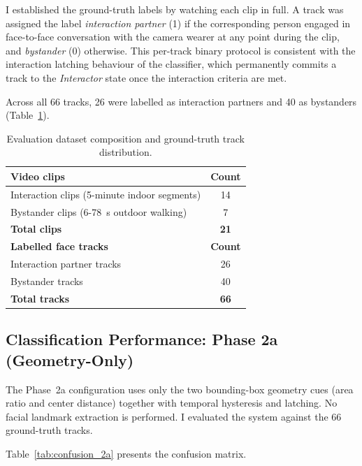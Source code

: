 I established the ground-truth labels by watching each clip in full. A track was assigned the label \emph{interaction partner} (1) if the
corresponding person engaged in face-to-face conversation with the camera wearer at
any point during the clip, and \emph{bystander} (0) otherwise. This per-track
binary protocol is consistent with the interaction latching behaviour of the classifier,
which permanently commits a track to the \emph{Interactor} state once the
interaction criteria are met.

Across all 66 tracks, 26 were labelled as interaction partners and 40 as bystanders
(Table~\ref{tab:dataset}).

\begin{table}[htbp]
\begin{singlespace}
\centering
\caption{Evaluation dataset composition and ground-truth track distribution.}
\label{tab:dataset}
\renewcommand{\arraystretch}{1.3}
\begin{tabular}{@{}lc@{}}
\toprule
\textbf{Video clips} & \textbf{Count} \\
\midrule
Interaction clips (5-minute indoor segments) & 14 \\
Bystander clips (6-78~s outdoor walking)    & 7  \\
\textbf{Total clips}                         & \textbf{21} \\
\midrule
\textbf{Labelled face tracks} & \textbf{Count} \\
\midrule
Interaction partner tracks & 26 \\
Bystander tracks           & 40 \\
\textbf{Total tracks}      & \textbf{66} \\
\bottomrule
\end{tabular}
\end{singlespace}
\end{table}

\subsection{Classification Performance: Phase 2a (Geometry-Only)}
\label{sec:results_2a}

The Phase~2a configuration uses only the two bounding-box geometry cues
(area ratio and center distance) together with temporal hysteresis and latching.
No facial landmark extraction is performed. I evaluated the system against the
66 ground-truth tracks.

Table~\ref{tab:confusion_2a} presents the confusion matrix.


